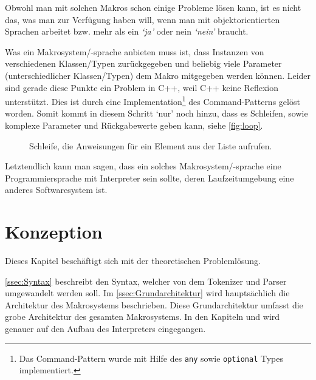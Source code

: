     Obwohl man mit solchen Makros schon einige Probleme lösen kann, ist es nicht das, was man zur Verfügung haben will, wenn man mit objektorientierten Sprachen arbeitet bzw. mehr als ein \textit{`ja'} oder nein \textit{`nein'} braucht.

    Was ein Makrosystem/-sprache anbieten muss ist, dass Instanzen von verschiedenen Klassen/Typen zurückgegeben und beliebig viele Parameter (unterschiedlicher Klassen/Typen) dem Makro mitgegeben werden können. Leider sind gerade diese Punkte ein Problem in C++, weil C++ keine Reflexion\autocites{vinoski2005time}{ferber1989computational} unterstützt. Dies ist durch eine Implementation\footnote{%
      Das Command-Pattern wurde mit Hilfe des \texttt{any}
      sowie \texttt{optional}
      Types implementiert.
    }\spewnotes{}
    des Command-Patterns gelöst worden. Somit kommt in diesem Schritt `nur' noch hinzu, dass es Schleifen, sowie komplexe Parameter und Rückgabewerte geben kann, siehe \autoref{fig:loop}.

    \begin{figure}[H]
      \centering
      \caption{Schleife, die Anweisungen für ein Element aus der Liste aufrufen.}
      \label{fig:loop}
    \end{figure}

    Letztendlich kann man sagen, dass ein solches Makrosystem/-sprache eine Programmiersprache mit Interpreter sein sollte, deren Laufzeitumgebung eine anderes Softwaresystem ist.

\section{Konzeption}
\label{sec:Konzeption}
  Dieses Kapitel beschäftigt sich mit der theoretischen Problemlösung.

  \autoref{ssec:Syntax} beschreibt den Syntax, welcher von dem Tokenizer und Parser umgewandelt werden soll. Im \autoref{ssec:Grundarchitektur} wird hauptsächlich die Architektur des Makrosystems beschrieben. Diese Grundarchitektur umfasst die grobe Architektur des gesamten Makrosystems. In den Kapiteln  und
   wird genauer auf den Aufbau des Interpreters eingegangen.

